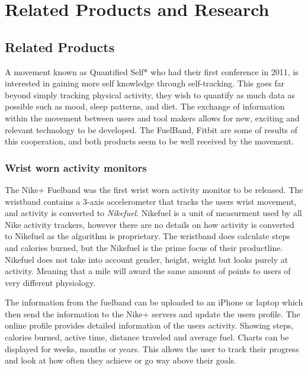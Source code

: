 \chapter{Related Products and Research} %

\label{Chapter3} %


\section{Related Products}

A movement known as Quantified Self*\cite{quantifiedSelf} who had their first conference in 2011\cite{bodyHackers}, is interested in gaining more self knowledge through self-tracking. This goes far beyond simply tracking physical activity, they wish to quantify as much data as possible such as mood, sleep patterns, and diet. The exchange of information within the movement between users and tool makers allows for new, exciting and relevant technology to be developed. The FuelBand\cite{fuelBand}, Fitbit\cite{fitBit} are some of results of this cooperation, and both products seem to be well received by the movement. %

\subsection{Wrist worn activity monitors}
The Nike+ Fuelband\cite{fuelBand} was the first wrist worn activity monitor to be released. The wristband contains a 3-axis accelerometer that tracks the users wrist movement, and activity is converted to \emph{Nikefuel}. Nikefuel\cite{nikefuel} is a unit of measurment used by all Nike activity trackers, however there are no details on how activity is converted to Nikefuel as the algorithm is proprietary. The wristband does calculate steps and calories burned, but the Nikefuel is the prime focus of their productline. Nikefuel does not take into account gender, height, weight but looks purely at activity. Meaning that a mile will award the same amount of points to users of very different physiology.

The information from the fuelband can be uploaded to an iPhone or laptop which then send the information to the Nike+ servers and update the users profile. The online profile provides detailed information of the users activity. Showing steps, calories burned, active time, distance traveled and average fuel. Charts can be displayed for weeks, months or years. This allows the user to track their progress and look at how often they achieve or go way above their goals.\cite{fuelbandTechSpce} 

